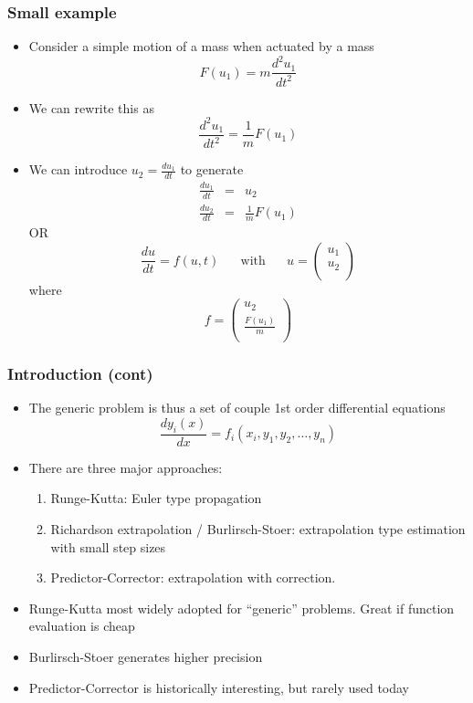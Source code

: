 \documentclass[10pt]{beamer}
\begin{document}
\begin{frame}
  \frametitle{Small example}
  \begin{itemize}
  \item Consider a simple motion of a mass when actuated by a mass
    \[
      F(u_1) = m \frac{ d^2 u_1 }{ d t^2 }
    \]
  \item We can rewrite this as
    \[
      \frac{d^2 u_1}{d t^2} = \frac{1}{m} F(u_1)
    \]
  \item We can introduce $u_2 = \frac{du_1}{dt}$ to generate
    \[
      \begin{array}{rcl}
        \frac{du_1}{dt} & = & u_2\\
        \frac{du_2}{dt} & = & \frac{1}{m} F(u_1)
      \end{array}
    \] OR
    \[
      \frac{du}{dt} = f( u, t) \mbox{~~~~ with ~~~~} u = \left(
        \begin{array}{c}
          u_1 \\ u_2\\
        \end{array} \right)
    \]
    where
    \[
      f = \left(
        \begin{array}{c}
          u_2\\
          \frac{F(u_1)}{m}\\
        \end{array} \right)
    \]
  \end{itemize}
\end{frame}

\begin{frame}
  \frametitle{Introduction (cont)}
  \begin{itemize}
  \item The generic problem is thus a set of couple 1st order differential equations
    \[
      \frac{d y_i(x)}{dx} = f_i(x_i, y_1, y_2, \ldots, y_n)
    \]
  \item There are three major approaches:
    \begin{enumerate}
    \item Runge-Kutta: Euler type propagation
    \item Richardson extrapolation / Burlirsch-Stoer: extrapolation type estimation with small step sizes
    \item Predictor-Corrector: extrapolation with correction. 
    \end{enumerate}
  \item Runge-Kutta most widely adopted for ``generic'' problems. Great if function evaluation is cheap
  \item Burlirsch-Stoer generates higher precision
  \item Predictor-Corrector is historically interesting, but rarely used today
  \end{itemize}
\end{frame}
\end{document}
